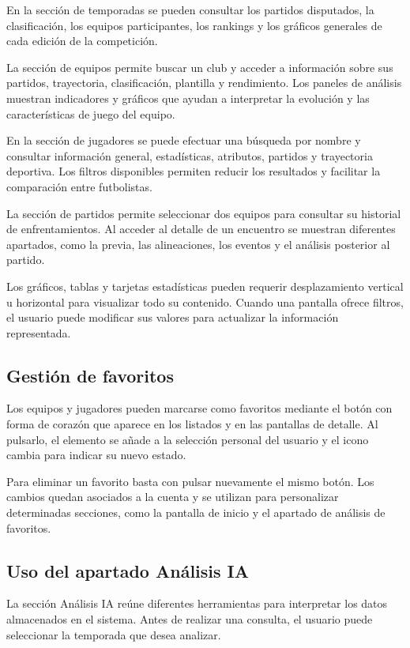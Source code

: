 En la sección de temporadas se pueden consultar los partidos disputados, la clasificación, los equipos participantes, los rankings y los gráficos generales de cada edición de la competición.

La sección de equipos permite buscar un club y acceder a información sobre sus partidos, trayectoria, clasificación, plantilla y rendimiento. Los paneles de análisis muestran indicadores y gráficos que ayudan a interpretar la evolución y las características de juego del equipo.

En la sección de jugadores se puede efectuar una búsqueda por nombre y consultar información general, estadísticas, atributos, partidos y trayectoria deportiva. Los filtros disponibles permiten reducir los resultados y facilitar la comparación entre futbolistas.

La sección de partidos permite seleccionar dos equipos para consultar su historial de enfrentamientos. Al acceder al detalle de un encuentro se muestran diferentes apartados, como la previa, las alineaciones, los eventos y el análisis posterior al partido.

Los gráficos, tablas y tarjetas estadísticas pueden requerir desplazamiento vertical u horizontal para visualizar todo su contenido. Cuando una pantalla ofrece filtros, el usuario puede modificar sus valores para actualizar la información representada.

\subsection{Gestión de favoritos}

Los equipos y jugadores pueden marcarse como favoritos mediante el botón con forma de corazón que aparece en los listados y en las pantallas de detalle. Al pulsarlo, el elemento se añade a la selección personal del usuario y el icono cambia para indicar su nuevo estado.

Para eliminar un favorito basta con pulsar nuevamente el mismo botón. Los cambios quedan asociados a la cuenta y se utilizan para personalizar determinadas secciones, como la pantalla de inicio y el apartado de análisis de favoritos.

\subsection{Uso del apartado Análisis IA}

La sección Análisis IA reúne diferentes herramientas para interpretar los datos almacenados en el sistema. Antes de realizar una consulta, el usuario puede seleccionar la temporada que desea analizar.

